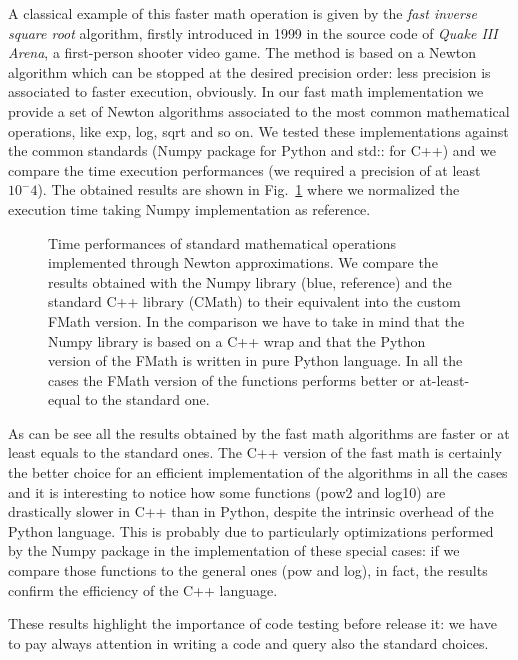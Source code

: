 \documentclass{standalone}
\begin{document}
A classical example of this faster math operation is given by the \emph{fast inverse square root} algorithm, firstly introduced in 1999 in the source code of \emph{Quake III Arena}, a first-person shooter video game.
The method is based on a Newton algorithm which can be stopped at the desired precision order: less precision is associated to faster execution, obviously.
In our \textsf{fast math} implementation we provide a set of Newton algorithms associated to the most common mathematical operations, like \textsf{exp}, \textsf{log}, \textsf{sqrt} and so on.
We tested these implementations against the common standards (\textsf{Numpy} package for \textsf{Python} and \textsf{std::} for \textsf{C++}) and we compare the time execution performances (we required a precision of at least $10^-4$).
The obtained results are shown in Fig.~\ref{fig:fmath} where we normalized the execution time taking \textsf{Numpy} implementation as reference.

\begin{figure}[htbp]
\centering
\def\svgwidth{0.8\textwidth}

\caption{Time performances of standard mathematical operations implemented through Newton approximations.
We compare the results obtained with the \textsf{Numpy} library (blue, reference) and the standard \textsf{C++} library (\textsf{CMath}) to their equivalent into the custom \textsf{FMath} version.
In the comparison we have to take in mind that the \textsf{Numpy} library is based on a \textsf{C++} wrap and that the \textsf{Python} version of the \textsf{FMath} is written in pure \textsf{Python} language.
In all the cases the \textsf{FMath} version of the functions performs better or at-least-equal to the standard one.
}
\label{fig:fmath}
\end{figure}

As can be see all the results obtained by the \textsf{fast math} algorithms are faster or at least equals to the standard ones.
The \textsf{C++} version of the \textsf{fast math} is certainly the better choice for an efficient implementation of the algorithms in all the cases and it is interesting to notice how some functions (\textsf{pow2} and \textsf{log10}) are drastically slower in \textsf{C++} than in \textsf{Python}, despite the intrinsic overhead of the \textsf{Python} language.
This is probably due to particularly optimizations performed by the \textsf{Numpy} package in the implementation of these special cases: if we compare those functions to the general ones (\textsf{pow} and \textsf{log}), in fact, the results confirm the efficiency of the \textsf{C++} language.

These results highlight the importance of code testing before release it: we have to pay always attention in writing a code and query also the standard choices.
\end{document}
